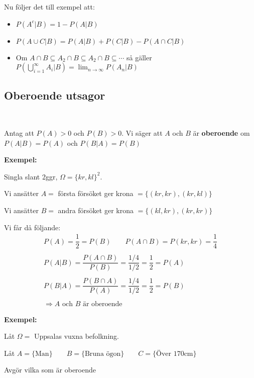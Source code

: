 \par\bigskip
\noindent Nu följer det till exempel att:
\begin{itemize}
  \item $P(A^c|B) = 1-P(A|B)$
  \item $P(A\cup C| B) = P(A|B)+P(C|B)-P(A\cap C |B)$
  \item Om $A\cap B\subseteq A_2\cap B\subseteq A_2\cap B\subseteq\cdots$ så gäller $P\left(\bigcup_{i=1}^{\infty}A_i|B\right) = \lim_{n\to\infty}P(A_n|B)$
\end{itemize}
\par\bigskip
\subsection{Oberoende utsagor}\hfill\\
\par
\noindent Antag att $P(A) >0$ och $P(B)>0$. Vi säger att $A$ och $B$ är \textbf{oberoende} om $P(A|B) = P(A)$ och $P(B|A) = P(B)$
\par\bigskip
\noindent\textbf{Exempel:}\par
\noindent Singla slant 2ggr, $\Omega = \{kr,kl\}^2$.\par
\noindent Vi ansätter $A= $ första försöket ger krona $= \{(kr,kr),(kr,kl)\}$\par
\noindent Vi ansätter $B = $ andra försöket ger krona $ = \{(kl,kr),(kr,kr)\}$
\par\bigskip
\noindent Vi får då följande:
\begin{equation*}
  \begin{gathered}
    P(A) = \dfrac{1}{2} = P(B)\qquad P(A\cap B) = P(kr,kr) = \dfrac{1}{4}\\\\
    P(A|B) = \dfrac{P(A\cap B)}{P(B)} = \dfrac{1/4}{1/2} = \dfrac{1}{2} = P(A)\\\\
    P(B|A) = \dfrac{P(B\cap A)}{P(A)} = \dfrac{1/4}{1/2} = \dfrac{1}{2}=P(B)\\\\
    \Rightarrow\text{$A$ och $B$ är oberoende}
  \end{gathered}
\end{equation*}
\par\bigskip
\noindent\textbf{Exempel:}\par
\noindent Låt $\Omega = $ Uppsalas vuxna befolkning.\par
\noindent Låt $A = \{\text{Man}\}\qquad B = \{\text{Bruna ögon}\}\qquad C = \{\text{Över 170cm}\}$
\par\bigskip
\noindent Avgör vilka som är oberoende 
